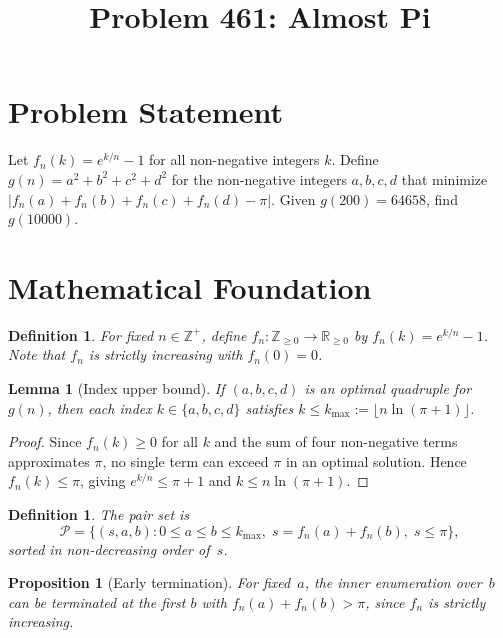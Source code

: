 \documentclass[11pt]{article}
\title{Problem 461: Almost Pi}
\author{}
\date{}
\newtheorem{lemma}[theorem]{Lemma}
\newtheorem{proposition}[theorem]{Proposition}
\newtheorem{definition}[theorem]{Definition}
\begin{document}
\maketitle

\section{Problem Statement}

Let $f_n(k) = e^{k/n} - 1$ for all non-negative integers $k$. Define $g(n) = a^2 + b^2 + c^2 + d^2$ for the non-negative integers $a, b, c, d$ that minimize $\left|f_n(a) + f_n(b) + f_n(c) + f_n(d) - \pi\right|$. Given $g(200) = 64658$, find $g(10000)$.

\section{Mathematical Foundation}

\begin{definition}
For fixed $n \in \mathbb{Z}^+$, define $f_n \colon \mathbb{Z}_{\ge 0} \to \mathbb{R}_{\ge 0}$ by $f_n(k) = e^{k/n} - 1$. Note that $f_n$ is strictly increasing with $f_n(0) = 0$.
\end{definition}

\begin{lemma}[Index upper bound]
\label{lem:bound}
If $(a, b, c, d)$ is an optimal quadruple for $g(n)$, then each index $k \in \{a,b,c,d\}$ satisfies $k \le k_{\max} := \lfloor n \ln(\pi + 1) \rfloor$.
\end{lemma}

\begin{proof}
Since $f_n(k) \ge 0$ for all $k$ and the sum of four non-negative terms approximates $\pi$, no single term can exceed $\pi$ in an optimal solution. Hence $f_n(k) \le \pi$, giving $e^{k/n} \le \pi + 1$ and $k \le n \ln(\pi + 1)$.
\end{proof}

\begin{definition}
The \emph{pair set} is
\[
\mathcal{P} = \bigl\{(s, a, b) : 0 \le a \le b \le k_{\max},\; s = f_n(a) + f_n(b),\; s \le \pi\bigr\},
\]
sorted in non-decreasing order of~$s$.
\end{definition}

\begin{proposition}[Early termination]
\label{prop:prune}
For fixed~$a$, the inner enumeration over~$b$ can be terminated at the first $b$ with $f_n(a) + f_n(b) > \pi$, since $f_n$ is strictly increasing.
\end{proposition}
\end{document}

